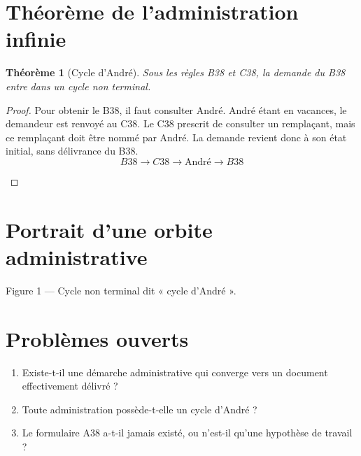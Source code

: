 \documentclass[11pt,a4paper]{article}
\newtheorem{theoreme}{Théorème}
\theoremstyle{remark}\newtheorem*{remarque}{Remarque}
\begin{document}
\section{Théorème de l'administration infinie}
\begin{theoreme}[Cycle d'André]
Sous les règles B38 et C38, la demande du B38 entre dans un cycle non terminal.
\end{theoreme}
\begin{proof}
Pour obtenir le B38, il faut consulter André. André étant en vacances, le demandeur est renvoyé au C38. Le C38 prescrit de consulter un remplaçant, mais ce remplaçant doit être nommé par André. La demande revient donc à son état initial, sans délivrance du B38.
\[\boxed{B38\longrightarrow C38\longrightarrow\text{André}\longrightarrow B38}\]
\begin{center}\end{center}
\end{proof}
\section{Portrait d'une orbite administrative}
\begin{center}
\end{center}
\begin{center}\small Figure 1 --- Cycle non terminal dit « cycle d'André ».\end{center}
\section{Problèmes ouverts}
\begin{enumerate}
\item Existe-t-il une démarche administrative qui converge vers un document effectivement délivré ?
\item Toute administration possède-t-elle un cycle d'André ?
\item Le formulaire A38 a-t-il jamais existé, ou n'est-il qu'une hypothèse de travail ?
\end{enumerate}
\end{document}
